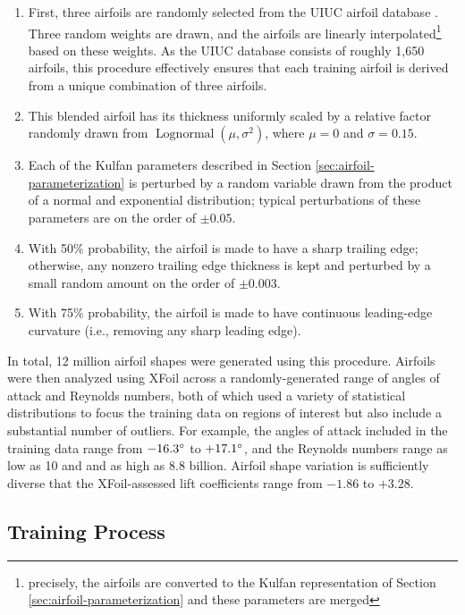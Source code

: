 \documentclass[conf]{new-aiaa}
\begin{document}
    \begin{enumerate}
        \item First, three airfoils are randomly selected from the UIUC airfoil database \cite{uiuc_airfoil_database}. Three random weights are drawn, and the airfoils are linearly interpolated\footnote{precisely, the airfoils are converted to the Kulfan representation of Section \ref{sec:airfoil-parameterization} and these parameters are merged} based on these weights. As the UIUC database consists of roughly 1,650 airfoils, this procedure effectively ensures that each training airfoil is derived from a unique combination of three airfoils.
        \item This blended airfoil has its thickness uniformly scaled by a relative factor randomly drawn from $\operatorname{Lognormal}(\mu, \sigma^2)$, where $\mu=0$ and $\sigma=0.15$.
        \item Each of the Kulfan parameters described in Section \ref{sec:airfoil-parameterization} is perturbed by a random variable drawn from the product of a normal and exponential distribution; typical perturbations of these parameters are on the order of $\pm 0.05$.
        \item With 50\% probability, the airfoil is made to have a sharp trailing edge; otherwise, any nonzero trailing edge thickness is kept and perturbed by a small random amount on the order of $\pm 0.003$.
        \item With 75\% probability, the airfoil is made to have continuous leading-edge curvature (i.e., removing any sharp leading edge).
    \end{enumerate}

    In total, 12 million airfoil shapes were generated using this procedure. Airfoils were then analyzed using XFoil across a randomly-generated range of angles of attack and Reynolds numbers, both of which used a variety of statistical distributions to focus the training data on regions of interest but also include a substantial number of outliers. For example, the angles of attack included in the training data range from $-16.3\degree$ to $+17.1\degree$, and the Reynolds numbers range as low as 10 and and as high as 8.8 billion. Airfoil shape variation is sufficiently diverse that the XFoil-assessed lift coefficients range from $-1.86$ to $+3.28$.

    \subsection{Training Process}
    \label{sec:training-process}
\end{document}
